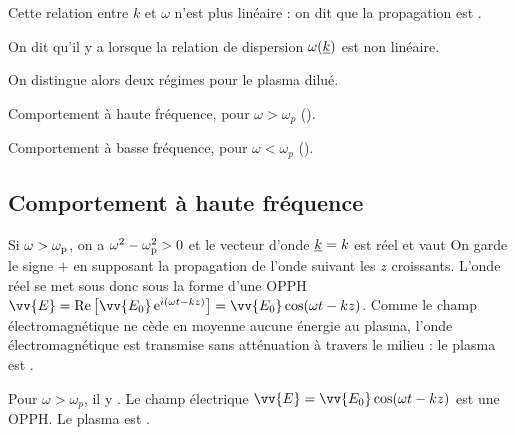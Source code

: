 \documentclass[12pt,fancy]{cours}
\begin{document}
  Cette relation  entre $k$ et $\omega$ n’est plus linéaire : on dit que la propagation est .
  
  \begin{definition}[Dispersion]\label{def:}
    On dit qu’il y a  lorsque la relation de dispersion $\omega(\underline{k})$ est non linéaire.
  \end{definition}
 
  
  On distingue alors deux régimes pour le plasma dilué.
  \begin{liste}
    \item Comportement à haute fréquence, pour $\omega > \omega_p$ ().
    \item Comportement à basse fréquence, pour $\omega < \omega_p$ ().
  \end{liste}
  
\subsection{Comportement à haute fréquence}
\label{sec:plasma_HF}

Si $\omega>\omega_{\rm{p}}$, on a $\omega^2-\omega_{\rm{p}}^2>0$ et le vecteur d'onde $\underline{k}=k$ est réel et vaut
On garde le signe $+$ en supposant la propagation de l'onde suivant les $z$ croissants.
 L'onde réel se met sous donc sous la forme d'une OPPH $\vv{E}=\re\left[  \vv{{E_0}}\,\e^{i(\omega t-kz)} \right] = \vv{E_0}\cos(\omega t-kz)$. Comme le champ électromagnétique ne cède en moyenne aucune énergie au plasma, l'onde électromagnétique est transmise sans atténuation à travers le milieu : le plasma est .

  \begin{prop}\label{prop:}
    Pour $\omega > \omega_p$, il y . Le champ électrique $\vv{E}=\vv{E_0}\cos(\omega t-kz)$ est une OPPH. Le plasma est .
  \end{prop}
  
\end{document}
